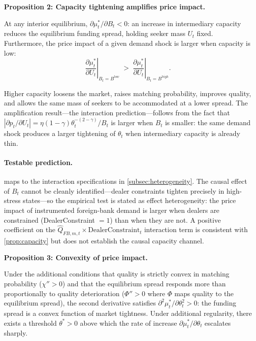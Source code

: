 \bigskip
\noindent\textbf{Proposition 2: Capacity tightening amplifies price impact.}

\begin{proposition}
  \label{prop:capacity}
  At any interior equilibrium, $\partial \mu_t^* / \partial B_t < 0$: an
  increase in intermediary capacity reduces the equilibrium funding spread,
  holding seeker mass $U_t$ fixed. Furthermore, the price impact of a given
  demand shock is larger when capacity is low:
  \[
    \left.\frac{\partial \mu_t^*}{\partial U_t}\right|_{B_t = B^{low}} \;>\;
    \left.\frac{\partial \mu_t^*}{\partial U_t}\right|_{B_t = B^{high}}.
  \]
\end{proposition}

Higher capacity loosens the market, raises matching probability, improves quality,
and allows the same mass of seekers to be accommodated at a lower spread. The
amplification result---the interaction prediction---follows from the fact that
$|\partial p_t / \partial U_t| = \eta(1-\gamma)\theta_t^{-(2-\gamma)} / B_t$ is
larger when $B_t$ is smaller: the same demand shock produces a larger tightening
of $\theta_t$ when intermediary capacity is already thin.

\paragraph{Testable prediction.}  maps to the interaction
specifications in \cref{subsec:heterogeneity}. The causal effect of $B_t$ cannot
be cleanly identified---dealer constraints tighten precisely in high-stress
states---so the empirical test is stated as effect heterogeneity: the price
impact of instrumented foreign-bank demand is larger when dealers are constrained
(DealerConstraint $= 1$) than when they are not. A positive coefficient on the
$\hat{Q}_{FB,m,t} \times \text{DealerConstraint}_t$ interaction term is
consistent with \cref{prop:capacity} but does not establish the causal capacity
channel.

\bigskip
\noindent\textbf{Proposition 3: Convexity of price impact.}

\begin{proposition}
  \label{prop:nonlinear}
  Under the additional conditions that quality is strictly convex in matching
  probability ($\chi'' > 0$) and that the equilibrium spread responds more than
  proportionally to quality deterioration ($\Phi'' > 0$ where $\Phi$ maps quality
  to the equilibrium spread), the second derivative satisfies
  $\partial^2 \mu_t^* / \partial \theta_t^2 > 0$: the funding spread is a convex
  function of market tightness. Under additional regularity, there exists a
  threshold $\theta^* > 0$ above which the rate of increase $\partial \mu_t^* /
  \partial \theta_t$ escalates sharply.
\end{proposition}

